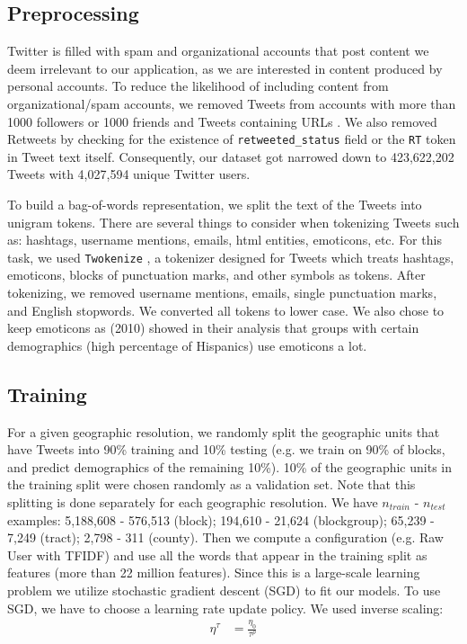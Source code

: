 \documentclass[letterpaper]{article}
\begin{document}
\subsection{Preprocessing}

Twitter is filled with spam and organizational accounts that post content we deem irrelevant to our application, as we are interested in content produced by personal accounts. To reduce the likelihood of including content from organizational/spam accounts, we removed Tweets from accounts with more than 1000 followers or 1000 friends \cite{lee2011seven,mccorriston2015organizations} and Tweets containing URLs \cite{guo2014detecting}. We also removed Retweets by checking for the existence of \texttt{retweeted\_status} field or the \texttt{RT} token in Tweet text itself. Consequently, our dataset got narrowed down to 423,622,202 Tweets with 4,027,594 unique Twitter users.

To build a bag-of-words representation, we split the text of the Tweets into unigram tokens. There are several things to consider when tokenizing Tweets such as: hashtags, username mentions, emails, html entities, emoticons, etc. For this task, we used \texttt{Twokenize} \cite{tokenizepy}, a tokenizer designed for Tweets which treats hashtags, emoticons, blocks of punctuation marks, and other symbols as tokens. After tokenizing, we removed username mentions, emails, single punctuation marks, and English stopwords. We converted all tokens to lower case. We also chose to keep emoticons as \citeauthor{o2010mixture} (2010) showed in their analysis that groups with certain demographics (high percentage of Hispanics) use emoticons a lot.

\subsection{Training}

For a given geographic resolution, we randomly split the geographic units that have Tweets into 90\% training and 10\% testing (e.g. we train on 90\% of blocks, and predict  demographics of the remaining 10\%). 10\% of the geographic units in the training split were chosen randomly as a validation set. Note that this splitting is done separately for each geographic resolution. We have $n_{train}$ - $n_{test}$ examples: 5,188,608 - 576,513 (block); 194,610 - 21,624 (blockgroup); 65,239 - 7,249 (tract); 2,798 - 311 (county). Then we compute a configuration (e.g. Raw User with TFIDF) and use all the words that appear in the training split as features (more than 22 million features). Since this is a large-scale learning problem we utilize stochastic gradient descent (SGD) to fit our models. To use SGD, we have to choose a learning rate update policy. We used inverse scaling:
\begin{align*}
    \eta^{\tau} &= \frac{\eta_0}{\tau^\rho}
\end{align*}
\end{document}

